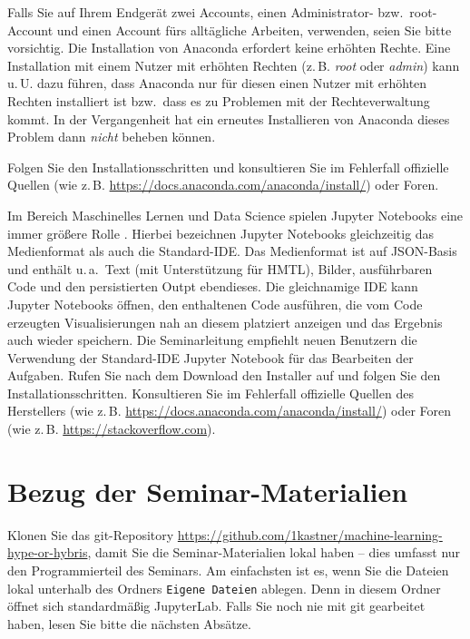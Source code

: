 \documentclass{tufte-handout}
\begin{document}
Falls Sie auf Ihrem Endgerät zwei Accounts, einen Administrator- bzw.\ root-Account und einen Account fürs alltägliche Arbeiten, verwenden, seien Sie bitte vorsichtig.
Die Installation von Anaconda erfordert keine erhöhten Rechte.
Eine Installation mit einem Nutzer mit erhöhten Rechten (z.\,B. \emph{root} oder \emph{admin}) kann u.\,U. dazu führen, dass Anaconda nur für diesen einen Nutzer mit erhöhten Rechten installiert ist bzw.\ dass es zu Problemen mit der Rechteverwaltung kommt.
In der Vergangenheit hat ein erneutes Installieren von Anaconda dieses Problem dann \emph{nicht} beheben können.

Folgen Sie den Installationsschritten und konsultieren Sie im Fehlerfall offizielle Quellen (wie z.\,B. \url{https://docs.anaconda.com/anaconda/install/}) oder Foren.

Im Bereich Maschinelles Lernen und Data Science spielen Jupyter Notebooks eine immer größere Rolle%
\cite{perkel_why_2018,hiltch_jupyter_2019}.
Hierbei bezeichnen Jupyter Notebooks gleichzeitig das Medienformat als auch die Standard-IDE.
Das Medienformat ist auf JSON-Basis und enthält u.\,a.\ Text (mit Unterstützung für HMTL), Bilder, ausführbaren Code und den persistierten Outpt ebendieses.
Die gleichnamige IDE kann Jupyter Notebooks öffnen, den enthaltenen Code ausführen, die vom Code erzeugten Visualisierungen nah an diesem platziert anzeigen und das Ergebnis auch wieder speichern.
Die Seminarleitung empfiehlt neuen Benutzern die Verwendung der Standard-IDE Jupyter Notebook für das Bearbeiten der Aufgaben.
Rufen Sie nach dem Download den Installer auf und folgen Sie den Installationsschritten.
Konsultieren Sie im Fehlerfall offizielle Quellen des Herstellers (wie z.\,B. \url{https://docs.anaconda.com/anaconda/install/}) oder Foren (wie z.\,B. \url{https://stackoverflow.com}).


\section{Bezug der Seminar-Materialien}
\label{sec:git-clone}

Klonen Sie das git-Repository
\url{https://github.com/1kastner/machine-learning-hype-or-hybris},
damit Sie die Seminar-Materialien lokal haben -- dies umfasst nur den Programmierteil des Seminars.
Am einfachsten ist es, wenn Sie die Dateien lokal unterhalb des Ordners \texttt{Eigene Dateien} ablegen.
Denn in diesem Ordner öffnet sich standardmäßig JupyterLab.
Falls Sie noch nie mit git gearbeitet haben, lesen Sie bitte die nächsten Absätze.
\end{document}
